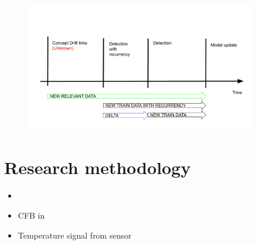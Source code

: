 \begin{figure}[htb!]
	\centering
	\includegraphics[width=0.9\textwidth]{images/google_slides/scheme_cd_recurrency}
  \caption{
	}\label{fig:research_question}
\end{figure}


\section{Research methodology}




\begin{itemize}
  \item 
  \item CFB in~\cite{x}
  \item Temperature signal from sensor
\end{itemize}

